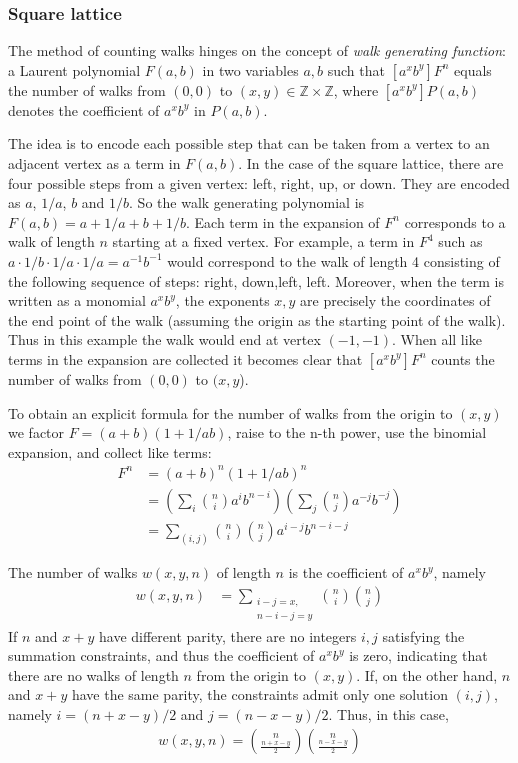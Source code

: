 \documentclass[12pt]{article}
\begin{document}
\newcommand{\zz}{\mathbb{Z} \times \mathbb{Z}}

\subsubsection*{Square lattice}
The method of counting walks hinges on the concept of {\em walk generating function}: a Laurent polynomial $F(a,b)$ in two variables $a,b$ such that $[a^xb^y]F^n$ equals the number of walks from $(0,0)$ to $(x,y) \in \mathbb{Z} \times \mathbb{Z}$, where $[a^xb^y]P(a, b)$ denotes the coefficient of $a^xb^y$ in $P(a,b)$.

The idea is to encode each possible step that can be taken from a vertex to an adjacent vertex as a term in $F(a,b)$. In the case of the square lattice, there are four possible steps from a given vertex: left, right, up, or down. They are encoded as $a$, $1/a$, $b$ and $1/b$.  So the walk generating polynomial is $F(a,b) = a + 1/a + b + 1/b$. Each term in the expansion of $F^n$ corresponds to a walk of length $n$ starting at a fixed vertex. For example, a term in $F^4$ such as $a \cdot 1/b \cdot 1/a \cdot 1/a = a^{-1}b^{-1}$ would correspond to the walk of length 4 consisting of the following sequence of steps: right, down,left, left. Moreover, when the term is written as a monomial $a^x b^y$, the exponents $x, y$ are precisely the coordinates of the end point of the walk (assuming the origin as the starting point of the walk).  Thus in this example the walk would end at vertex $(-1,-1)$.  When all like terms in the expansion are collected it becomes clear that $[a^xb^y]F^n$ counts the number of walks from $(0,0)$ to $(x,y$). 
 
To obtain an explicit formula for the number of walks from the origin to $(x,y)$ we factor $F = (a+b)(1+1/ab)$, raise to the n-th power, use the binomial expansion, and collect like terms:
\begin{align*}
F^n &= (a+b)^n(1+1/ab)^n \\
    &= (\sum_i\binom{n}{i} a^ib^{n-i})(\sum_j \binom{n}{j} a^{-j}b^{-j}) \\
    &= \sum_{(i,j)} \binom{n}{i}\binom{n}{j} a^{i-j}b^{n-i-j}
\end{align*}


The number of walks $w(x,y,n)$ of length $n$ is the coefficient of $a^xb^y$, namely
\begin{align*}
w(x,y,n) &= \sum_{\substack{i-j=x,\\n-i-j=y}} \binom{n}{i}\binom{n}{j}
\end{align*}
If $n$ and $x+y$ have different parity, there are no integers $i,j$ satisfying the summation constraints, and thus the coefficient of $a^xb^y$ is zero, indicating that there are no walks of length $n$ from the origin to $(x,y)$. If, on the other hand, $n$ and $x+y$ have the same parity, the constraints admit only one solution $(i,j)$, namely $i = (n + x -y)/2$ and $j = (n - x -y)/2$. Thus, in this case, 
\begin{align*}
  w(x,y,n) = \binom{n}{\frac{n+x-y}{2}} \binom{n}{\frac{n-x-y}{2}}
\end{align*}
\end{document}
